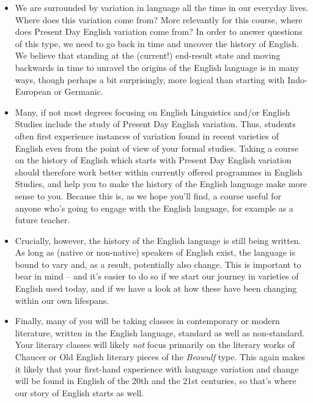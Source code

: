 \begin{itemize}
\item We are surrounded by variation in language all the time in our everyday lives. Where does this variation come from? More relevantly for this course, where does Present Day English variation come from? In order to answer questions of this type, we need to go back in time and uncover the history of English. We believe that standing at the (current!) end-result state and moving backwards in time to unravel the origins of the English language is in many ways, though perhaps a bit surprisingly, more logical than starting with Indo-European or Germanic.

\item Many, if not most degrees focusing on English Linguistics and/or English Studies include the study of Present Day English variation. Thus, students often first experience instances of variation found in recent varieties of English even from the point of view of your formal studies. Taking a course on the history of English which starts with Present Day English variation should therefore work better within currently offered programmes in English Studies, and help you to make the history of the English language make more sense to you. Because this is, as we hope you'll find, a course useful for anyone who's going to engage with the English language, for example as a future teacher.

\item Crucially, however, the history of the English language is still being written. As long as (native or non-native) speakers of English exist, the language is bound to vary and, as a result, potentially also change. This is important to bear in mind -- and it's easier to do so if we start our journey in varieties of English used today, and if we have a look at how these have been changing within our own lifespans.

\item Finally, many of you will be taking classes in contemporary or modern literature, written in the English language, standard as well as non-standard. Your literary classes will likely \emph{not} focus primarily on the literary works of Chaucer or Old English literary pieces of the \emph{Beowulf} type. This again makes it likely that your first-hand experience with language variation and change will be found in English of the 20th and the 21st centuries, so that's where our story of English starts as well.
\end{itemize}


